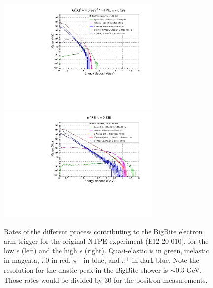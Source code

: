 \begin{figure}[!h]
  \centering
    \includegraphics[width=8cm]{Plots/BBECalRates_gen-tpe_le.pdf}
    \includegraphics[width=8cm]{Plots/BBECalRates_gen-tpe_he.pdf}
    \caption{Rates of the different process contributing to the BigBite electron arm trigger for the original NTPE experiment (E12-20-010), for the low $\epsilon$ (left) and the high $\epsilon$ (right). Quasi-elastic is in green, inelastic in magenta, $\pi0$ in red, $\pi^-$ in blue, and $\pi^+$ in dark blue. Note the resolution for the elastic peak in the BigBite shower is $\sim0.3$ GeV. Those rates would be divided by 30 for the positron measurements.}
    \label{fig:BBRates}
\end{figure}

